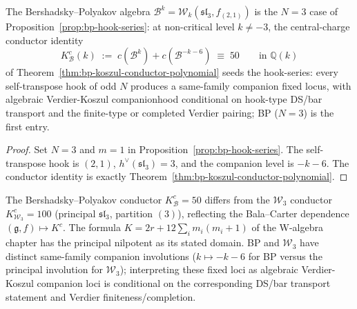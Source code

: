 \begin{corollary}
\label{cor:bp-koszul-conductor-seed}
The Bershadsky--Polyakov algebra
$\mathcal{B}^k = \mathcal{W}_k(\mathfrak{sl}_3, f_{(2,1)})$
is the $N=3$ case of Proposition~\ref{prop:bp-hook-series}: at
non-critical level $k \neq -3$, the central-charge conductor identity
\[
 K^c_{\mathcal{B}}(k) \;:=\;
 c(\mathcal{B}^k) + c(\mathcal{B}^{-k-6}) \;\equiv\; 50
 \qquad \text{in } \mathbb{Q}(k)
\]
of Theorem~\ref{thm:bp-koszul-conductor-polynomial} seeds the
hook-series: every self-transpose hook of odd $N$ produces a
same-family companion fixed locus, with algebraic Verdier-Koszul
companionhood conditional on hook-type DS/bar transport and the
finite-type or completed Verdier pairing; BP ($N=3$) is the first
entry.
\end{corollary}

\begin{proof}
Set $N=3$ and $m=1$ in
Proposition~\ref{prop:bp-hook-series}. The self-transpose hook is
$(2,1)$, $h^\vee(\mathfrak{sl}_3)=3$, and the companion level is
$-k-6$. The conductor identity is exactly
Theorem~\ref{thm:bp-koszul-conductor-polynomial}.
\end{proof}

\begin{remark}
\label{rem:kw-bp-vs-principal}
The Bershadsky--Polyakov conductor $K^c_{\mathcal{B}} = 50$
differs from the $\mathcal{W}_3$ conductor $K^c_{\mathcal{W}_3} = 100$
\textup{(}principal $\mathfrak{sl}_3$, partition $(3)$\textup{)},
reflecting the Bala--Carter dependence
$(\mathfrak{g}, f) \mapsto K^c$. The formula
$K = 2r + 12\sum_i m_i(m_i+1)$ of the W-algebra chapter has the
principal nilpotent as its stated domain. BP and $\mathcal{W}_3$ have
distinct same-family companion involutions ($k \mapsto -k-6$ for BP
versus the principal involution for $\mathcal{W}_3$); interpreting
these fixed loci as algebraic Verdier-Koszul companion loci is
conditional on the corresponding DS/bar transport statement and
Verdier finiteness/completion.
\end{remark}
